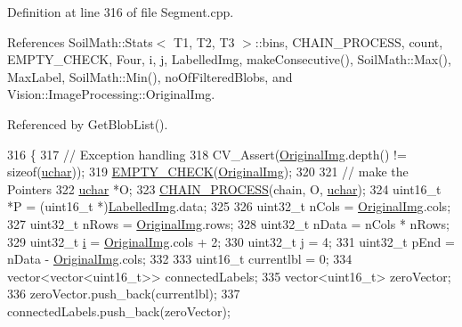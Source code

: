 Definition at line 316 of file Segment.\+cpp.



References Soil\+Math\+::\+Stats$<$ T1, T2, T3 $>$\+::bins, C\+H\+A\+I\+N\+\_\+\+P\+R\+O\+C\+E\+S\+S, count, E\+M\+P\+T\+Y\+\_\+\+C\+H\+E\+C\+K, Four, i, j, Labelled\+Img, make\+Consecutive(), Soil\+Math\+::\+Max(), Max\+Label, Soil\+Math\+::\+Min(), no\+Of\+Filtered\+Blobs, and Vision\+::\+Image\+Processing\+::\+Original\+Img.



Referenced by Get\+Blob\+List().


\begin{DoxyCode}
316                                                                          \{
317   \textcolor{comment}{// Exception handling}
318   CV\_Assert(\hyperlink{class_vision_1_1_image_processing_a77c370dab270158a4e9c634e2d3f48e7}{OriginalImg}.depth() != \textcolor{keyword}{sizeof}(\hyperlink{_soil_math_types_8h_a65f85814a8290f9797005d3b28e7e5fc}{uchar}));
319   \hyperlink{_image_processing_8h_a27c4e53b88a0f9f2c097add555131056}{EMPTY\_CHECK}(\hyperlink{class_vision_1_1_image_processing_a77c370dab270158a4e9c634e2d3f48e7}{OriginalImg});
320 
321   \textcolor{comment}{// make the Pointers}
322   \hyperlink{_soil_math_types_8h_a65f85814a8290f9797005d3b28e7e5fc}{uchar} *O;
323   \hyperlink{_image_processing_8h_a6e6f0183cb53c76ef458d4fd34e07bcd}{CHAIN\_PROCESS}(chain, O, \hyperlink{_soil_math_types_8h_a65f85814a8290f9797005d3b28e7e5fc}{uchar});
324   uint16\_t *P = (uint16\_t *)\hyperlink{class_vision_1_1_segment_a4daa143f6cd4a753d3bbe45c6a67d27f}{LabelledImg}.data;
325 
326   uint32\_t nCols = \hyperlink{class_vision_1_1_image_processing_a77c370dab270158a4e9c634e2d3f48e7}{OriginalImg}.cols;
327   uint32\_t nRows = \hyperlink{class_vision_1_1_image_processing_a77c370dab270158a4e9c634e2d3f48e7}{OriginalImg}.rows;
328   uint32\_t nData = nCols * nRows;
329   uint32\_t \hyperlink{_comparision_pictures_2_createtest_image_8m_a6f6ccfcf58b31cb6412107d9d5281426}{i} = \hyperlink{class_vision_1_1_image_processing_a77c370dab270158a4e9c634e2d3f48e7}{OriginalImg}.cols + 2;
330   uint32\_t \hyperlink{_comparision_pictures_2_createtest_image_8m_ac86694252f8dfdb19aaeadc4b7c342c6}{j} = 4;
331   uint32\_t pEnd = nData - \hyperlink{class_vision_1_1_image_processing_a77c370dab270158a4e9c634e2d3f48e7}{OriginalImg}.cols;
332 
333   uint16\_t currentlbl = 0;
334   vector<vector<uint16\_t>> connectedLabels;
335   vector<uint16\_t> zeroVector;
336   zeroVector.push\_back(currentlbl);
337   connectedLabels.push\_back(zeroVector);

\end{DoxyCode}
